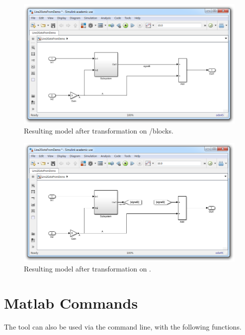 \documentclass{article}
\begin{document}
\begin{figure}
	\centering
	\includegraphics[width=\textwidth]{../figs/Demo2}
	\caption{Resulting model after  transformation on  \goto/\from blocks.}
	\label{FIG:demo2}
\end{figure}

\begin{figure}
	\centering
	\includegraphics[width=\textwidth]{../figs/Demo3}
	\caption{Resulting model after  transformation on .}
	\label{FIG:demo3}
\end{figure}

\section{Matlab Commands}

The tool can also be used via the \Matlab command line, with the following functions.
\end{document}
